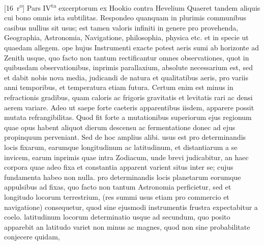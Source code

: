 [16~r\textsuperscript{o}] Pars IV\textsuperscript{ta} excerptorum ex Hookio\protect{} contra Hevelium\protect{}
\pend 
\count{}
\count{}
\count{} 
\pstart Quaeret tandem aliquis cui bono omnis ista subtilitas. Respondeo quanquam in plurimis communibus casibus nullius sit usus; est tamen valoris infiniti in genere pro provehenda, Geographia, Astronomia, Navigatione, philosophia, physica etc. et in specie ut quaedam allegem.
\pend 
\pstart {} ope hujus Instrumenti exacte potest  aeris sumi ab horizonte ad Zenith usque, quo facto non tantum rectificantur omnes observationes, quot in quibus\-dam observationibus, inprimis parallaxium, absolute necessarium est, sed et dabit nobis  nova media, judicandi de natura et qualitatibus aeris, pro variis anni temporibus, et temperatura etiam futura. Certum enim est  minus in refractionis gradibus, quam caloris ac frigoris gravitatis et levitatis rari ac densi aerem variare. Adeo ut saepe forte caeteris apparentibus iisdem, apparere possit mutata refrangibilitas. Quod fit forte a mutationibus superiorum ejus regionum quae opus habent aliquot dierum descensu ac fermentatione donec ad ejus  propinquum perveniant. Sed de hoc amplius alibi.
\pend 
\pstart {}\textsuperscript{} usus est pro determinandis locis fixarum, earumque longitudinum ac latitudinum, et distantiarum a se invicem, earum inprimis quae intra Zodiacum, unde brevi judicabitur, an haec corpora quae adeo fixa et constantia apparent varient situs inter se; cujus  fundamenta habeo non nulla.
\pend 
\pstart {} pro determinandis locis planetarum eorumque appulsibus ad fixas, quo facto non tantum Astronomia perficietur, sed et longitudo locorum terrestrium, (res summi usus etiam pro commercio et navigatione) consequetur, quod sine ejusmodi instrumentis frustra expectabitur a coelo.
\pend 
\newpage
\pstart {}\textsuperscript{} latitudinum locorum determinatio usque ad secundum, quo posito apparebit an latitudo variet non minus ac magnes, quod non sine probabilitate conjecere quidam,\pend 
\count{}
\count{}
\count{} 
